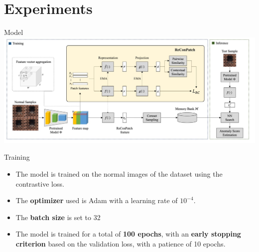 \documentclass{beamer}
\begin{document}
\section{Experiments}
\begin{frame}{Model}
\includegraphics[width=\textwidth]
{assets/model}
\end{frame}
\begin{frame}{Training}
      \begin{itemize}
              \item The model is trained on the normal images of the dataset 
              using the contrastive loss.
              \item The \textbf{optimizer} used is Adam with a learning rate of $10^{-4}$.
              \item The \textbf{batch size} is set to 32
              \item The model is trained for a total of \textbf{100 epochs}, with an \textbf{early stopping
               criterion} based on the validation loss, with a patience of 10 epochs.
              \end{itemize}
\end{frame}
\end{document}
